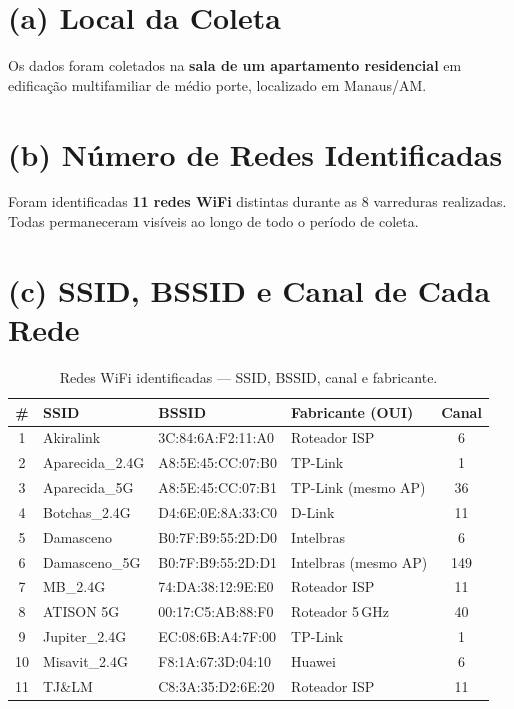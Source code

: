 \documentclass[
  12pt,
  a4paper,
  oneside,
  brazil,
  chapter=TITLE,
  section=TITLE,
]{abntex2}
\begin{document}
\section{(a) Local da Coleta}

Os dados foram coletados na \textbf{sala de um apartamento residencial} em
edificação multifamiliar de médio porte, localizado em Manaus/AM.

\section{(b) Número de Redes Identificadas}

Foram identificadas \textbf{11 redes WiFi} distintas durante as 8 varreduras
realizadas. Todas permaneceram visíveis ao longo de todo o período de coleta.

\section{(c) SSID, BSSID e Canal de Cada Rede}

\begin{table}[H]
  \centering
  \caption{Redes WiFi identificadas --- SSID, BSSID, canal e fabricante.}
  \label{tab:redes}
  \small
  \begin{tabular}{clllc}
    \toprule
    \textbf{\#} & \textbf{SSID} & \textbf{BSSID} & \textbf{Fabricante (OUI)} & \textbf{Canal} \\
    \midrule
    1  & Akiralink         & 3C:84:6A:F2:11:A0 & Roteador ISP       &   6 \\
    2  & Aparecida\_2.4G   & A8:5E:45:CC:07:B0 & TP-Link            &   1 \\
    3  & Aparecida\_5G     & A8:5E:45:CC:07:B1 & TP-Link (mesmo AP) &  36 \\
    4  & Botchas\_2.4G     & D4:6E:0E:8A:33:C0 & D-Link             &  11 \\
    5  & Damasceno         & B0:7F:B9:55:2D:D0 & Intelbras          &   6 \\
    6  & Damasceno\_5G     & B0:7F:B9:55:2D:D1 & Intelbras (mesmo AP) & 149 \\
    7  & MB\_2.4G          & 74:DA:38:12:9E:E0 & Roteador ISP       &  11 \\
    8  & ATISON 5G         & 00:17:C5:AB:88:F0 & Roteador 5\,GHz    &  40 \\
    9  & Jupiter\_2.4G     & EC:08:6B:A4:7F:00 & TP-Link            &   1 \\
    10 & Misavit\_2.4G     & F8:1A:67:3D:04:10 & Huawei             &   6 \\
    11 & TJ\&LM            & C8:3A:35:D2:6E:20 & Roteador ISP       &  11 \\
    \bottomrule
  \end{tabular}
\end{table}
\end{document}
